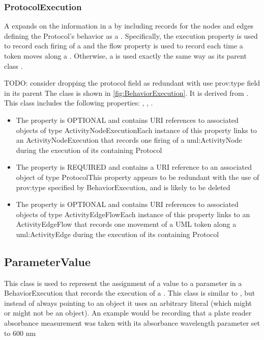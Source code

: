 \subsubsection{ProtocolExecution}%
\label{sec:paml:ProtocolExecution}%
A  expands on the information in a  by including records for
        the nodes and edges defining the Protocol's behavior as a . Specifically, the execution property
        is used to record each firing of a  and the flow property is used to record each time a token
        moves along a .
        Otherwise, a  is used exactly the same way as its parent class .

        TODO: consider dropping the protocol field as redundant with use prov:type field in its parent%
\newline%
\linebreak%
The  class is shown in \ref{fig:BehaviorExecution}. It is derived from .%
This class includes the following properties: , , . %
\begin{itemize}%
\item%
The  property is OPTIONAL and contains URI references to associated objects of type ActivityNodeExecutionEach instance of this property links to an ActivityNodeExecution that records one
        firing of a uml:ActivityNode during the execution of its containing Protocol%
\item%
The  property is REQUIRED and contains a URI reference to an associated object of type ProtocolThis property appears to be redundant with the use of prov:type specified by BehaviorExecution, and is likely to be deleted%
\item%
The  property is OPTIONAL and contains URI references to associated objects of type ActivityEdgeFlowEach instance of this property links to an ActivityEdgeFlow that records one movement of a UML
        token along a uml:ActivityEdge during the execution of its containing Protocol%
\end{itemize}%
\subsection{ParameterValue}%
\label{sec:paml:ParameterValue}%
This class is used to represent the assignment of a value to a parameter in a BehaviorExecution
        that records the execution of a . This class is similar to , but instead of always
        pointing to an object it uses an arbitrary literal (which might or might not be an object). An example would
        be recording that a plate reader absorbance measurement was taken with its absorbance wavelength parameter set
        to 600 nm%
\newline%
\linebreak%


